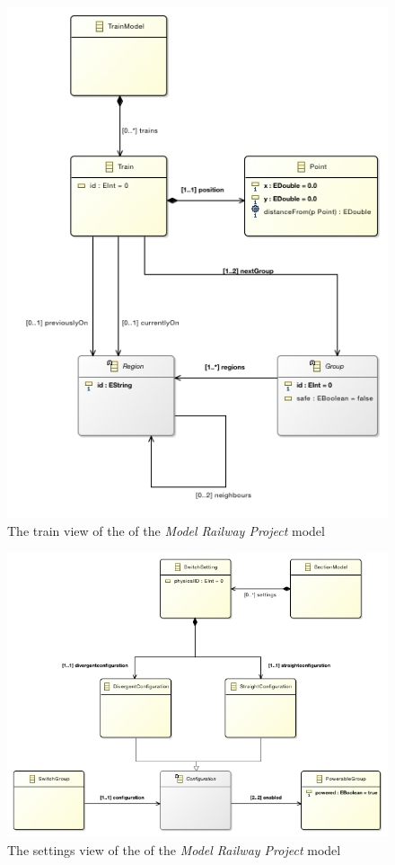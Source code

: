 \newpage
\begin{figure}[H]
	\hspace*{-1in}
	\centering
	\includegraphics[width=1.0\linewidth]{include/figures/chapter_6/metamodels/trainmodel}
	\caption{The train view of the  of the \emph{Model Railway Project} model} 
	\label{fig:case_study:trainmodel}
\end{figure}
\newpage
\begin{figure}[H]
	\centering
	\includegraphics[width=1.2\linewidth]{include/figures/chapter_6/metamodels/settingmodel}
	\caption{The settings view of the  of the \emph{Model Railway Project} model} 
	\label{fig:case_study:settingmodel}
\end{figure}

